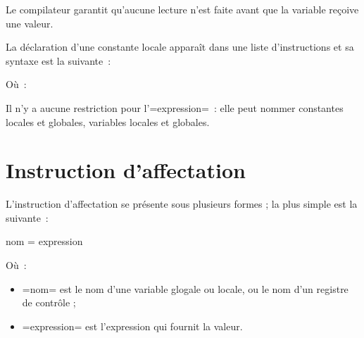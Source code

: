 Le compilateur garantit qu'aucune lecture n'est faite avant que la variable reçoive une valeur.











La déclaration d'une constante locale apparaît dans une liste d'instructions et sa syntaxe est la suivante~:


Où~:

Il n'y a aucune restriction pour l'\plm=expression=~: elle peut nommer constantes locales et globales, variables locales et globales.






\section {Instruction d'affectation}

L'instruction d'affectation se présente sous plusieurs formes ; la plus simple est la suivante~:

\begin{PLM}
nom = expression
\end{PLM}

Où~:
\begin{itemize}
  \item \plm=nom= est le nom d'une variable glogale ou locale, ou le nom d'un registre de contrôle ;
  \item \plm=expression= est l'expression qui fournit la valeur.
\end{itemize}









